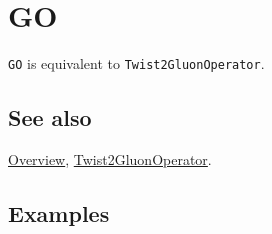 \documentclass[../FeynCalcManual.tex]{subfiles}
\begin{document}
\hypertarget{go}{%
\section{GO}\label{go}}

\texttt{GO} is equivalent to \texttt{Twist2GluonOperator}.

\subsection{See also}

\hyperlink{toc}{Overview},
\hyperlink{twist2gluonoperator}{Twist2GluonOperator}.

\subsection{Examples}
\end{document}
